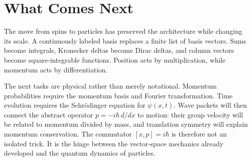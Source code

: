 \begin{classroomqa}
\end{classroomqa}

\section{What Comes Next}

The move from spins to particles has preserved the architecture while changing its scale. A continuously labeled basis replaces a finite list of basis vectors. Sums become integrals, Kronecker deltas become Dirac deltas, and column vectors become square-integrable functions. Position acts by multiplication, while momentum acts by differentiation.

The next tasks are physical rather than merely notational. Momentum probabilities require the momentum basis and Fourier transformation. Time evolution requires the Schr\"odinger equation for \(\psi(x,t)\). Wave packets will then connect the abstract operator \(p=-i\hbar\,d/dx\) to motion: their group velocity will be related to momentum divided by mass, and translation symmetry will explain momentum conservation. The commutator \([x,p]=i\hbar\) is therefore not an isolated trick. It is the hinge between the vector-space mechanics already developed and the quantum dynamics of particles.
